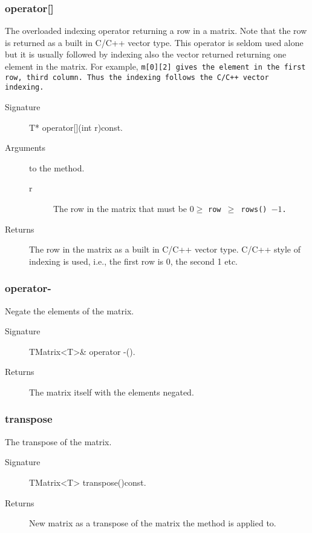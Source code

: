 \subsubsection{operator[]}

The overloaded  indexing operator returning  a row in a  matrix.  Note
that  the row  is returned  as  a built  in C/C++  vector type.   This
operator is seldom  used alone but it is  usually followed by indexing
also  the vector  returned returning  one element  in the  matrix. For
example, \tt  m[0][2] \rm  gives the element  in the first  row, third
column. Thus the indexing follows the C/C++ vector indexing.

\begin{description}
   \item[Signature] T* operator[](int r)const.
   \item[Arguments] to the method.
    \begin{description}
      \item[r] The row in the matrix that must be 
                 $0 \geq$ \tt row $\geq$ \tt rows() \rm $- 1$.
      \end{description}
  \item[Returns] The row in the matrix as a built in C/C++ vector type.
                 C/C++ style of indexing is used, i.e., the first row is 0, 
                 the second 1 etc. 
\end{description}

\subsubsection{operator-}
Negate the elements of the matrix. 
\begin{description}
    \item[Signature] TMatrix<T>\& operator -().
   \item[Returns] The matrix itself with the elements negated.
\end{description}

\subsubsection{transpose}
The transpose of the matrix. 

\begin{description}
    \item[Signature] TMatrix<T> transpose()const.
   \item[Returns] New matrix as a transpose of the matrix
                  the method is applied to.
\end{description}

